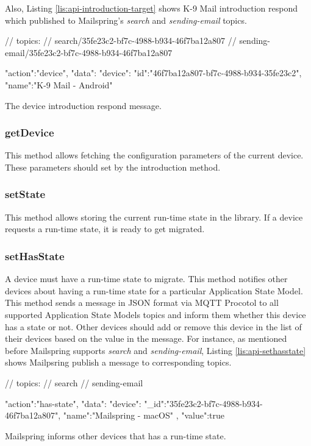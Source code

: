 Also, Listing \ref{lis:api-introduction-target} shows K-9 Mail introduction respond which  published to Mailspring's \textit{search} and \textit{sending-email} topics.

\FloatBarrier
\begin{code}
\begin{js2}
// topics:
// search/35fe23c2-bf7c-4988-b934-46f7ba12a807
// sending-email/35fe23c2-bf7c-4988-b934-46f7ba12a807
\end{js2}

\begin{json}
{
   "action":"device",
   "data":{
      "device":{
         "id":"46f7ba12a807-bf7c-4988-b934-35fe23c2",
         "name":"K-9 Mail - Android"
      }
   }
}
\end{json}
\caption{The device introduction respond message.}
\label{lis:api-introduction-target}
\end{code}
\FloatBarrier


\subsubsection{getDevice}
This method allows fetching the configuration parameters of the current device. These parameters should set by the introduction method.

\subsubsection{setState}
This method allows storing the current run-time state in the library. If a  device requests a run-time state, it is ready to get migrated. 

\subsubsection{setHasState}
A device must have a run-time state to migrate. This method notifies other devices about having a run-time state for a particular Application State Model. This method sends a message in JSON format via MQTT Procotol to all supported Application State Models topics and inform them whether this device has a state or not. Other devices should add or remove this device in the list of their devices based on the value in the message. For instance, as mentioned before Mailspring supports \textit{search} and \textit{sending-email}, Listing \ref{lis:api-sethasstate} shows Mailpsring publish a message to corresponding topics.


\FloatBarrier
\begin{code}
\begin{js2}
// topics:
// search
// sending-email
\end{js2}

\begin{json}
{
   "action":"has-state",
   "data":{
      "device":{
         "_id":"35fe23c2-bf7c-4988-b934-46f7ba12a807",
         "name":"Mailspring - macOS"
      },
      "value":true
   }
}
\end{json}
\caption{Mailspring informs other devices that has a run-time state.}
\label{lis:api-sethasstate}
\end{code}
\FloatBarrier


